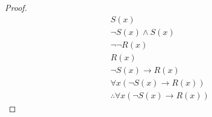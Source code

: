 \documentclass{article}
\begin{document}
\begin{itemize}
\begin{proof}
\begin{align*}
            &S(x) \tag{Modus Ponens} \\
            &\neg S(x) \land S(x) \tag{Conjunction} \\
            &\neg \neg R(x) \tag{Negation} \\
            &R(x) \tag{Double Negation} \\
            &\neg S(x) \rightarrow R(x) \tag{Conditional} \\
            &\forall x (\neg S(x) \rightarrow R(x)) \tag{Universal Instantiation} \\
            &\boxed { \therefore \forall x (\neg S(x) \rightarrow R(x))} \tag{Conclusion} 
        \end{align*}
    \end{proof}       
\end{itemize}
\end{document}
